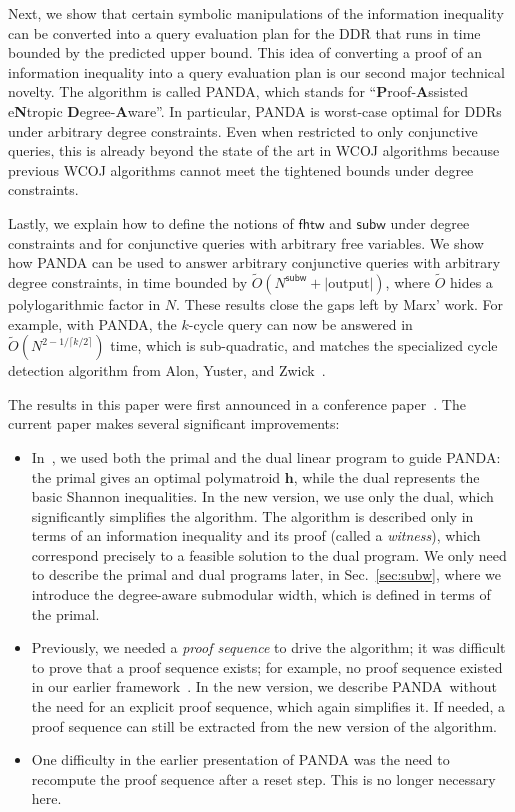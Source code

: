 \documentclass{theoretics}
\newcommand{\panda}{\textsf{PANDA}\xspace}
\newcommand{\fhtw}{\textsf{fhtw}}
\newcommand{\subm}{\textsf{subw}}
\begin{document}
Next, we show that certain symbolic manipulations of the information inequality can be converted
into a query evaluation plan for the DDR that runs in time bounded by the predicted upper
bound.
This idea of converting a proof of an information inequality into a query evaluation plan
is our second major technical novelty.
The algorithm is called \panda,
which stands for ``{\bf P}roof-{\bf A}ssisted e{\bf N}tropic {\bf D}egree-{\bf A}ware''.
In particular, \panda is worst-case optimal for
DDRs under arbitrary degree constraints. Even when restricted to only conjunctive queries,
this is already beyond the state of the art in WCOJ algorithms because previous WCOJ
algorithms cannot meet the tightened bounds under degree constraints.

Lastly, we explain how to define the notions of $\fhtw$ and $\subm$ under degree constraints
and for conjunctive queries with arbitrary free variables.
We show how \panda can be used to answer arbitrary conjunctive queries with arbitrary
degree constraints, in time bounded by $\tilde O(N^{\subm} + |\text{output}|)$, where $\tilde O$ hides a polylogarithmic factor in $N$.
These results close the gaps left by Marx' work.
For example, with \panda,
the $k$-cycle query can now be answered in $\tilde O(N^{2-1/\lceil k/2\rceil })$ time, which is
sub-quadratic, and matches the specialized cycle detection algorithm
from Alon, Yuster, and Zwick~\cite{DBLP:journals/algorithmica/AlonYZ97}.



The results in this paper were first announced in a conference paper~\cite{DBLP:conf/pods/Khamis0S17}.  The current paper makes several
significant improvements:
%
\begin{itemize}
\item In~\cite{DBLP:conf/pods/Khamis0S17}, we used both the primal and the dual linear
  program to guide \panda: the primal gives an optimal polymatroid $\bm h$, while the dual
  represents the basic Shannon inequalities.  In the new version, we use only the dual,
  which significantly simplifies the algorithm.  The algorithm is described only in terms of
  an information inequality and its proof (called a {\em witness}), which correspond
  precisely to a feasible solution to the dual program.  We only need to describe the primal
  and dual programs later, in Sec.~\ref{sec:subw}, where we introduce the degree-aware
  submodular width, which is defined in terms of the primal.

\item Previously, we needed a {\em proof sequence} to drive the algorithm; it was difficult
  to prove that a proof sequence exists; for example, no proof sequence existed in our
  earlier framework~\cite{DBLP:conf/pods/KhamisNS16}.  In the new version, we describe
  \panda\ without the need for an explicit proof sequence, which again simplifies it. If
  needed, a proof sequence can still be extracted from the new version of the algorithm.

\item One difficulty in the earlier presentation of \panda was the
  need to recompute the proof sequence after a reset step.  This is no
  longer necessary here.
\end{itemize}
\end{document}
